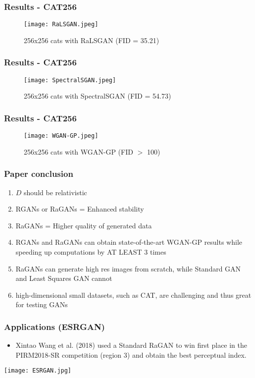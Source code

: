 \documentclass[t]{beamer}
\begin{document}
\begin{frame}
	\frametitle{Results - CAT256}

\begin{figure}[H]
	\centering
	\texttt{[image: RaLSGAN.jpeg]}
	\caption{256x256 cats with RaLSGAN (FID = 35.21)}
\end{figure}
\end{frame}

\begin{frame}
	\frametitle{Results - CAT256}

\begin{figure}[H]
	\centering
	\texttt{[image: SpectralSGAN.jpeg]}
	\caption{256x256 cats with SpectralSGAN (FID = 54.73)}
\end{figure}
\end{frame}

\begin{frame}
	\frametitle{Results - CAT256}


\begin{figure}[H]
	\centering
	\texttt{[image: WGAN-GP.jpeg]}
	\caption{256x256 cats with WGAN-GP (FID $>$ 100)}
\end{figure}

\end{frame}


\begin{frame}
\frametitle{Paper conclusion}
\begin{enumerate}
	\item $D$ should be relativistic
	\item RGANs or RaGANs = Enhanced stability
	\item RaGANs = Higher quality of generated data
	\item RGANs and RaGANs can obtain state-of-the-art WGAN-GP results while speeding up computations by AT LEAST 3 times
	\item RaGANs can generate high res images from scratch, while Standard GAN and Least Squares GAN cannot
	\item high-dimensional small datasets, such as CAT, are challenging and thus great for testing GANs
\end{enumerate}

\end{frame}


\begin{frame}
	\frametitle{Applications (ESRGAN)}
	\begin{itemize}
		\item Xintao Wang et al. (2018) used a Standard RaGAN to win first place in the PIRM2018-SR competition (region 3) and obtain the best perceptual index.
	\end{itemize}
	\centering
	\texttt{[image: ESRGAN.jpg]}
\end{frame}
\end{document}

